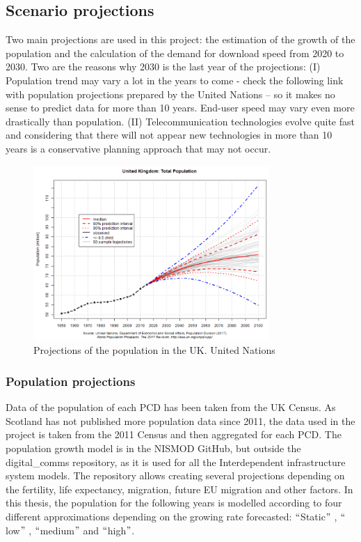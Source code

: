 \subsection{Scenario projections}
Two main projections are used in this project: the estimation of the growth of the population and the calculation of the demand for download speed from 2020 to 2030. Two are the reasons why 2030 is the last year of the projections: (I) Population trend may vary a lot in the years to come - check the following link with population projections prepared by the United Nations \cite{3-07} – so it makes no sense to predict data for more than 10 years. End-user speed may vary even more drastically than population. (II) Telecommunication technologies evolve quite fast and considering that there will not appear new technologies in more than 10 years is a conservative planning approach that may not occur.
\begin{figure}[H]
	\begin{Center}
		\includegraphics[width=0.8\textwidth]{./media/image18.png}
		\caption{Projections of the population in the UK. United Nations\cite{3-13}}
	\end{Center}
\end{figure}
\subsubsection*{Population projections}
Data of the population of each PCD has been taken from the UK Census. As Scotland has not published more population data since 2011, the data used in the project is taken from the 2011 Census and then aggregated for each PCD. The population growth model is in the NISMOD GitHub, but outside the digital\_comms repository, as it is used for all the Interdependent infrastructure system models. The repository \cite{3-08} allows creating several projections depending on the fertility, life expectancy, migration, future EU migration and other factors. In this thesis, the population for the following years is modelled according to four different approximations depending on the growing rate forecasted: $``$Static$"$ , $``$low$"$ , $``$medium$"$  and $``$high$"$.



